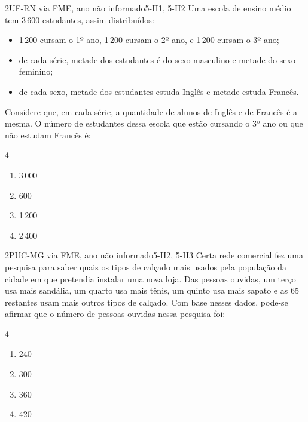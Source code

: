 \begin{questao}{2}{UF-RN via FME, ano não informado}{5-H1, 5-H2}\label{u5:ufrn21}
Uma escola de ensino médio tem 3\,600 estudantes, assim distribuídos:
\begin{itemize}[leftmargin=1.4em,itemsep=0pt]
  \item 1\,200 cursam o 1º ano, 1\,200 cursam o 2º ano, e 1\,200 cursam o 3º ano;
  \item de cada série, metade dos estudantes é do sexo masculino e metade do sexo feminino;
  \item de cada sexo, metade dos estudantes estuda Inglês e metade estuda Francês.
\end{itemize}
Considere que, em cada série, a quantidade de alunos de Inglês e de Francês é a mesma. O número de estudantes dessa escola que estão cursando o 3º ano ou que não estudam Francês é:
\begin{multicols}{4}
\begin{enumerate}[label=\alph*)]
  \item 3\,000
  \item 600
  \item 1\,200
  \item 2\,400
\end{enumerate}
\end{multicols}
\end{questao}

\begin{questao}{2}{PUC-MG via FME, ano não informado}{5-H2, 5-H3}\label{u5:pucmg32}
Certa rede comercial fez uma pesquisa para saber quais os tipos de calçado mais usados pela população da cidade em que pretendia instalar uma nova loja. Das pessoas ouvidas, um terço usa mais sandália, um quarto usa mais tênis, um quinto usa mais sapato e as 65 restantes usam mais outros tipos de calçado. Com base nesses dados, pode-se afirmar que o número de pessoas ouvidas nessa pesquisa foi:
\begin{multicols}{4}
\begin{enumerate}[label=\alph*)]
  \item 240
  \item 300
  \item 360
  \item 420
\end{enumerate}
\end{multicols}
\end{questao}

